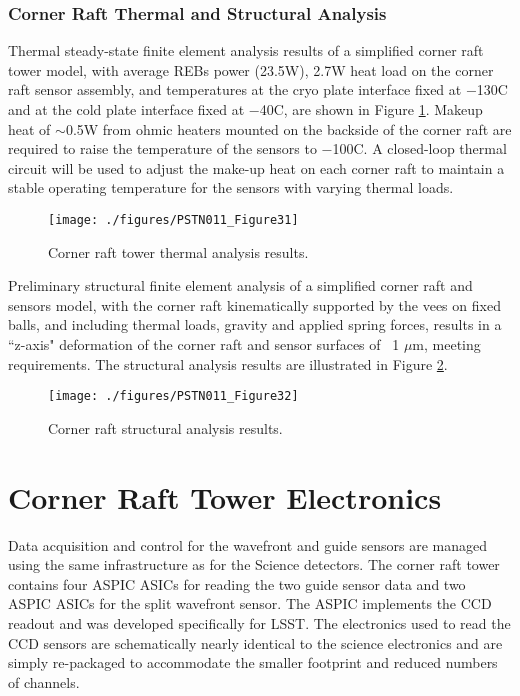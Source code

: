 \subsubsection{Corner Raft Thermal and Structural Analysis}

Thermal steady-state finite element analysis results of a simplified corner raft tower model, with
average REBs power (23.5W), 2.7W heat load on the corner raft sensor assembly, and temperatures at
the cryo plate interface fixed at $-$130\degsym C and at the cold plate interface fixed at $-$40\degsym C, are shown in Figure
\ref{fig:Fig31}. Makeup heat of $\sim$0.5W from ohmic heaters mounted on the backside of the corner raft are
required to raise the temperature of the sensors to $-$100\degsym C. A closed-loop thermal circuit will be used to
adjust the make-up heat on each corner raft to maintain a stable operating temperature for the sensors
with varying thermal loads.

\begin{figure}[htbp]
\begin{center}
\texttt{[image: ./figures/PSTN011\_Figure31]}
\caption{Corner raft tower thermal analysis results.}
\label{fig:Fig31}
\end{center}
\end{figure}

Preliminary structural finite element analysis of a simplified corner raft and sensors model, with the
corner raft kinematically supported by the vees on fixed balls, and including thermal loads, gravity and
applied spring forces, results in a ``z-axis" deformation of the corner raft and sensor surfaces of ~1 $\mu$m,
meeting requirements. The structural analysis results are illustrated in Figure \ref{fig:Fig32}. 

\begin{figure}[htbp]
\begin{center}
\texttt{[image: ./figures/PSTN011\_Figure32]}
\caption{Corner raft structural analysis results.}
\label{fig:Fig32}
\end{center}
\end{figure}

\section{Corner Raft Tower Electronics}

Data acquisition and control for the wavefront and guide sensors are managed using the same
infrastructure as for the Science detectors. The corner raft tower contains four ASPIC ASICs for reading
the two guide sensor data and two ASPIC ASICs for the split wavefront sensor. The ASPIC implements
the CCD readout and was developed specifically for LSST. The electronics used to read the CCD sensors
are schematically nearly identical to the science electronics and are simply re-packaged to
accommodate the smaller footprint and reduced numbers of channels.

